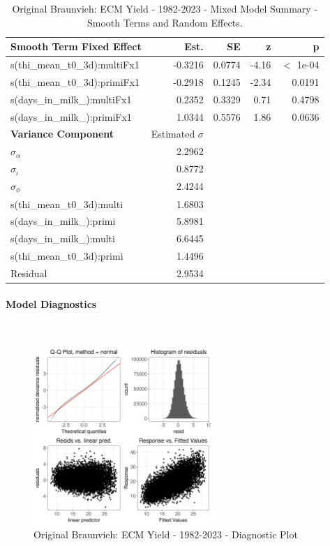 \newpage
\begin{table}[H]
\centering
\begin{tabular}
{l | r | r | r | r}
\textbf{Smooth Term Fixed Effect} & Est. & SE & z & p\\
\hline
\hline
s(thi\_mean\_t0\_3d):multiFx1 & -0.3216 & 0.0774 & -4.16 & $<$ 1e-04\\
s(thi\_mean\_t0\_3d):primiFx1 & -0.2918 & 0.1245 & -2.34 & 0.0191\\
s(days\_in\_milk\_):multiFx1 & 0.2352 & 0.3329 & 0.71 & 0.4798\\
s(days\_in\_milk\_):primiFx1 & 1.0344 & 0.5576 & 1.86 & 0.0636\\
\hline
\textbf{Variance Component} & Estimated $\sigma$ & & & \\
\hline
\hline
$\sigma_\alpha$ & 2.2962 & & & \\
$\sigma_\iota$ & 0.8772 & & & \\
$\sigma_\phi$ & 2.4244 & & & \\
s(thi\_mean\_t0\_3d):multi &  1.6803 & & & \\
s(days\_in\_milk\_):primi & 5.8981 & & & \\
s(days\_in\_milk\_):multi & 6.6445 & & & \\
s(thi\_mean\_t0\_3d):primi & 1.4496 & & & \\
Residual & 2.9534 & & & \\
\end{tabular}
\caption[]{Original Braunvieh: ECM Yield - 1982-2023 - Mixed Model Summary - Smooth Terms and Random Effects.}
\end{table}


\paragraph{Model Diagnostics} \quad \\
\begin{figure}[H]
    \centering
    \includegraphics[width=0.6\textwidth]{thesis/figures/models/ecm/full/ob_ecm_full/ob_ecm_full_diagnostics.png}
    \caption[]{Original Braunvieh: ECM Yield - 1982-2023 - Diagnostic Plot}
\end{figure}

